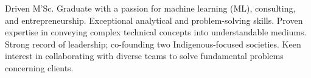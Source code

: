 

\begin{cvparagraph}

Driven M'Sc. Graduate with a passion for machine learning (ML), consulting, and entrepreneurship. Exceptional analytical and problem-solving skills. Proven expertise in conveying complex technical concepts into understandable mediums. Strong record of leadership; co-founding two Indigenous-focused societies. Keen interest in collaborating with diverse teams to solve fundamental problems concerning clients.
\end{cvparagraph}
